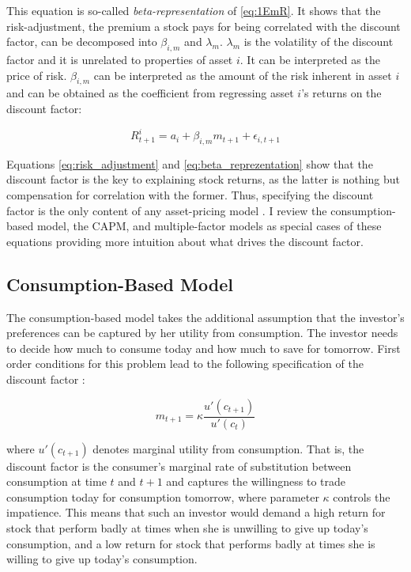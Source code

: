  		This equation is so-called \textit{beta-representation} of \ref{eq:1EmR}. It shows that the risk-adjustment, the premium a stock pays for being correlated with the discount factor, can be decomposed into $\beta_{i,m}$ and $\lambda_m$. $\lambda_m$ is the volatility of the discount factor and it is unrelated to properties of asset $i$. It can be interpreted as the price of risk. $\beta_{i,m}$ can be interpreted as the amount of the risk inherent in asset $i$ and can be obtained as the coefficient from regressing asset $i$'s returns on the discount factor: 
 		
 		\begin{equation}
 		R_{t+1}^i = a_i + \beta_{i,m}m_{t+1} + \epsilon_{i,t+1}
 		\end{equation} 
 		
 		Equations \ref{eq:risk_adjustment} and \ref{eq:beta_reprezentation} show that the discount factor is the key to explaining stock returns, as the latter is nothing but compensation for correlation with the former. Thus, specifying the discount factor is the only content of any asset-pricing model \cite{cochrane2009asset}. I review the consumption-based model, the CAPM, and multiple-factor models as special cases of these equations providing more intuition about what drives the discount factor. 
 			 	
	 	\subsection{Consumption-Based Model}
	 	
		 	The consumption-based model takes the additional assumption that the investor's preferences can be captured by her utility from consumption. The investor needs to decide how much to consume today and how much to save for tomorrow. First order conditions for this problem lead to the following specification of the discount factor \cite{cochrane2009asset}: 
		 	
		 	\begin{equation}
		 		m_{t+1} = \kappa \frac{u'(c_{t+1})}{u'(c_t)} \label{consumtion_based_model}
		 	\end{equation}
		 	
		 	where $u'(c_{t+1})$ denotes marginal utility from consumption. That is, the discount factor is the consumer's  marginal rate of substitution between consumption at time $t$ and $t+1$ and captures the willingness to trade consumption today for consumption tomorrow, where parameter $\kappa$ controls the impatience. This means that such an investor would demand a high return for stock that perform badly at times when she is unwilling to give up today's consumption, and a low return for stock that performs badly at times she is willing to give up today's consumption. 
		 	
